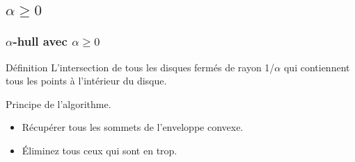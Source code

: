 \subsection{$\alpha \geq 0$}

\begin{frame}
  \frametitle{$\alpha$-hull avec $\alpha \geq 0$}
  \begin{block}{Définition}
		L'intersection de tous les disques fermés de rayon 1/$\alpha$ qui contiennent tous les points à l’intérieur du disque.
	\end{block} 
 
	\begin{block}{Principe de l'algorithme.}
		\begin{itemize}
			\item Récupérer tous les sommets de l'enveloppe convexe.
			\item Éliminez tous ceux qui sont en trop.
		\end{itemize}	
	\end{block} 


\end{frame}


